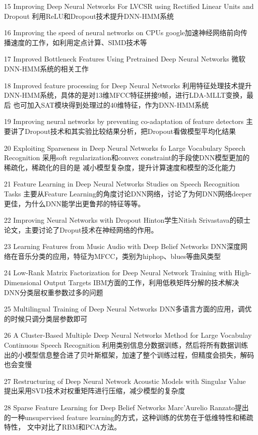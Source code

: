 15 Improving Deep Neural Networks For LVCSR using Rectified Linear Units and Dropout
   利用ReLU和Dropout技术提升DNN-HMM系统

16 Improving the speed of neural networks on CPUs
   google加速神经网络前向传播速度的工作，如利用定点计算、SIMD技术等

17 Improved Bottleneck Features Using Pretrained Deep Neural Networks
   微软DNN-HMM系统的相关工作

18 Improved feature processing for Deep Neural Networks
  利用特征处理技术提升DNN-HMM系统，具体的是对13维MFCC特征拼接9帧，进行LDA-MLLT变换，最后
  也可加入SAT模块得到处理过的40维特征，作为DNN-HMM系统

19 Improving neural networks by preventing co-adaptation of feature detectors
  主要讲了Dropout技术和其实验比较结果分析，把Dropout看做模型平均化结果

20 Exploiting Sparseness in Deep Neural Networks fo Large Vocabulary Speech Recognition
   采用soft regularization和convex constraint的手段使DNN模型更加的稀疏化，稀疏化的目的是
   减小模型复杂度，提升计算速度和模型的泛化能力

21 Feature Learning in Deep Neural Networks Studies on Speech Recognition Tasks
   主要从Feature Learning的角度讨论DNN网络，讨论了为何DNN网络deeper更佳，为什么DNN能学出更鲁邦的特征等等。

22 Improving Neural Networks with Dropout
   Hinton学生Nitish Srivastava的硕士论文，主要讨论了Droput技术在神经网络的作用。

23 Learning Features from Music Audio with Deep Belief Networks
   DNN深度网络在音乐分类的应用，特征为MFCC，类别为hiphop、blues等曲风类型

24 Low-Rank Matrix Factorization for Deep Neural Network Training with High-Dimensional Output Targets
   IBM方面的工作，利用低秩矩阵分解的技术解决DNN分类层权重参数过多的问题

25 Multilingual Training of Deep Neural Networks
   DNN多语言方面的应用，调优的时候只调分类层参数即可

26 A Cluster-Based Multiple Deep Neural Networks Method for Large Vocabulay Continuous Speech Recognition
   利用类别信息分数据训练，然后将所有数据训练出的小模型信息整合进了贝叶斯框架，加速了整个训练过程，但精度会损失，解码
   也会变慢

27 Restructuring of Deep Neural Network Acoustic Models with Singular Value
   提出采用SVD技术对权重矩阵进行压缩，减少模型的复杂度

28 Sparse Feature Learning for Deep Belief Networks
   Marc’Aurelio Ranzato提出的一种unsupervised feature learning的方式，这种训练的优势在于低维特性和稀疏特性，
   文中对比了RBM和PCA方法。

